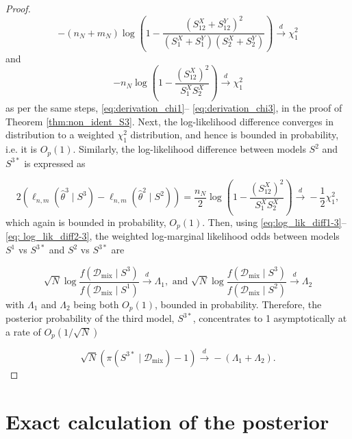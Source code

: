 \documentclass[accepted]{uai2026} %
\newcommand{\train}{\mathcal{D}}
\newcommand{\mixdata}{\train_{\text{mix}}}
\theoremstyle{boldremark}
\begin{document}
\begin{proof}
    $$-(n_N+m_N)\log \left(1-\frac{(S_{12}^X+S_{12}^Y)^2}{(S_1^X+S_1^Y)(S_2^X+S_2^Y)} \right) \xrightarrow{d} \chi_1^2$$
    and
    $$-n_N\log \left(1-\frac{(S_{12}^X)^2}{S_1^XS_2^X} \right) \xrightarrow{d} \chi_1^2$$
    as per the same steps, \eqref{eq:derivation_chi1}-- \eqref{eq:derivation_chi3}, in the proof of Theorem \ref{thm:non_ident_S3}. Next, the log-likelihood difference converges in distribution to a weighted $\chi^2_1$ distribution, and hence is bounded in probability, i.e. it is $O_p(1)$. Similarly, the log-likelihood difference between models $S^2$ and $S^{3*}$ is expressed as

    \begin{equation}
        \label{eq: log_lik_diff2-3}
        2\left(\ell_{n,m}(\hat{\theta}^3\mid  S^3) - \ell_{n,m}(\hat{\theta}^2\mid  S^2) \right) = \frac{n_N}{2}\log \left(1-\frac{(S_{12}^X)^2}{S_1^XS_2^X} \right) \xrightarrow{d} - \frac{1}{2}\chi^2_1, 
    \end{equation}
    which again is bounded in probability, $O_p(1)$. Then, using 
    \eqref{eq:log_lik_diff1-3}--\eqref{eq: log_lik_diff2-3}, the weighted log-marginal likelihood odds between models $S^1$ vs $S^{3*}$ and $S^2$ vs $S^{3*}$ are

    $$\sqrt{N}\log \frac{f(\mixdata\mid S^3)}{f(\mixdata\mid S^1)} \xrightarrow{d} \Lambda_1, \text{ and } \sqrt{N}\log \frac{f(\mixdata\mid S^3)}{f(\mixdata\mid S^2)} \xrightarrow{d} \Lambda_2$$ 
    with $\Lambda_1$ and $\Lambda_2$ being both $O_p(1)$, bounded in probability. Therefore, the posterior probability of the third model, $S^{3*}$, concentrates to 1 asymptotically at a rate of $O_p(1/\sqrt{N})$

    $$ \sqrt{N}(\pi(S^{3*}\mid \mixdata)-1) \xrightarrow{d} -(\Lambda_1+\Lambda_2).$$
\end{proof}

\section{Exact calculation of the posterior}
\end{document}
